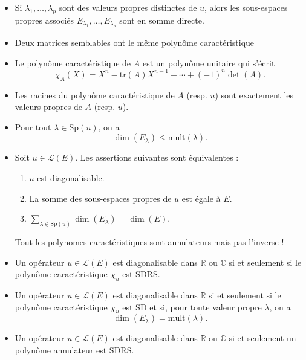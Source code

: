 \documentclass{article}
\begin{document}
\begin{itemize}[label=$\ast$]
\item Si $\lambda_1, \ldots, \lambda_p$ sont des valeurs propres distinctes de $u$, alors les sous-espaces propres associés $E_{\lambda_1}, \ldots, E_{\lambda_p}$ sont en somme directe.

\item Deux matrices semblables ont le même polynôme caractéristique

\item Le polynôme caractéristique de \(A\) est un polynôme unitaire qui s'écrit \[\chi_A(X) = X^n - \text{tr}(A)X^{n-1} + \cdots + (-1)^n\det(A).\]

\item Les racines du polynôme caractéristique de $A$ (resp. $u$) sont exactement les valeurs propres de $A$ (resp. $u$).

\item Pour tout $\lambda \in \text{Sp}(u)$, on a \[\dim(E_{\lambda}) \leq \text{mult}(\lambda).\]

\item Soit $u \in \mathcal{L}(E)$. Les assertions suivantes sont équivalentes :
\begin{enumerate}
    \item $u$ est diagonalisable.
    \item La somme des sous-espaces propres de $u$ est égale à $E$.
    \item $\sum_{\lambda \in \text{Sp}(u)} \dim(E_{\lambda}) = \dim(E)$.
\end{enumerate}

\begin{center}
Tout les polynomes caractéristiques sont annulateurs mais pas l'inverse !
\end{center}

\item Un opérateur $u \in \mathcal{L}(E)$ est diagonalisable dans $\mathbb{R}$ ou $\mathbb{C}$ si et seulement si le polynôme caractéristique $\chi_u$ est SDRS.

\item Un opérateur $u \in \mathcal{L}(E)$ est diagonalisable dans $\mathbb{R}$ si et seulement si le polynôme caractéristique $\chi_u$ est SD et si, pour toute valeur propre $\lambda$, on a \[\dim(E_{\lambda}) = \text{mult}(\lambda).\]

\item Un opérateur $u \in \mathcal{L}(E)$ est diagonalisable dans $\mathbb{R}$ ou $\mathbb{C}$ si et seulement un polynôme annulateur est SDRS.


\end{itemize}
\end{document}
